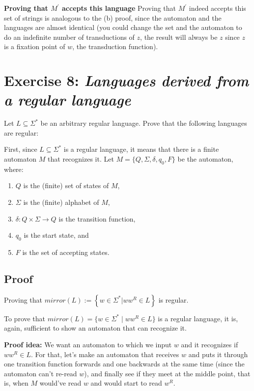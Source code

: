 \documentclass[12pt]{article}
\begin{document}
\textbf{Proving that $M^{'}$ accepts this language} 
Proving that $M^{'}$ indeed accepts this set of strings is analogous to the (b) proof, since the automaton and the languages are almost identical (you could change the set and the automaton to do an indefinite number of transductions of $z$, the result will always be $z$ since $z$ is a fixation point of $w$, the transduction function).

\pagebreak

\section{Exercise 8: \textbf{\textit{Languages derived from a regular language}}}

Let $L \subseteq \Sigma^*$ be an arbitrary regular language. Prove that the following languages are regular:

First, since $L \subseteq \Sigma^*$ is a regular language, it means that there is a finite automaton $M$ that recognizes it. Let $M = \{Q, \Sigma, \delta, q_0, F\}$ be the automaton, where:
\begin{enumerate}
    \item $Q$ is the (finite) set of states of $M$,
    \item $\Sigma$ is the (finite) alphabet of $M$,
    \item $\delta : Q \times \Sigma \rightarrow Q$ is the transition function,
    \item $q_0$ is the start state, and
    \item $F$ is the set of accepting states.
\end{enumerate}

\subsection{Proof}
Proving that $mirror(L) := \left\{ w \in \Sigma^* | ww^R \in L \right\}$ is regular.

To prove that $mirror(L) = \{w \in \Sigma^* \mid ww^R \in L\}$ is a regular language, it is, again, sufficient to show an automaton that can recognize it.

\textbf{Proof idea:} We want an automaton to which we input $w$ and it recognizes if $ww^R \in L$. For that, let's make an automaton that receives $w$ and puts it through one transition function forwards and one backwards at the same time (since the automaton can't re-read $w$), and finally see if they meet at the middle point, that is, when $M$ would've read $w$ and would start to read $w^R$.
\end{document}
